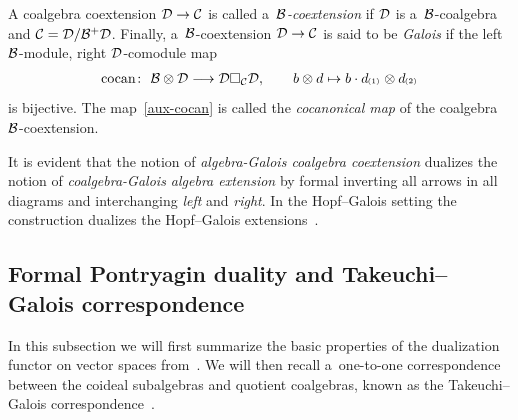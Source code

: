 \documentclass[pdftex]{sigma}
\numberwithin{equation}{section}
\newcommand{\ps}[1]{~\hspace{-4pt}_{^{(#1)}}}
\begin{document}
A coalgebra coextension ${\cal D}\to{\cal C}$ is called a~\emph{${\cal B}$-coextension} if ${\cal D}$ is a~${\cal
B}$-coalgebra and ${\cal C} ={\cal D}/{\cal B}^{+}{\cal D}$.
Finally, a~${\cal B}$-coextension ${\cal D}\to{\cal C}$ is said to be \emph{Galois} if the left ${\cal B}$-module, right
${\cal D}$-comodule map
\begin{gather}
\label{aux-cocan}
\operatorname{cocan}\colon \ {\cal B}\otimes {\cal D}\longrightarrow {\cal D}\Box_{\cal C}{\cal D},
\qquad
b\otimes d\mapsto b\cdot d\ps{1}\otimes d\ps{2}
\end{gather}
is bijective.
The map~\eqref{aux-cocan} is called the \emph{cocanonical map} of the coalgebra ${\cal B}$-coextension.

It is evident that the notion of \emph{algebra-Galois coalgebra coextension} dualizes the notion of
\emph{coalgebra-Galois algebra extension} by formal inverting all arrows in all diagrams and interchanging \emph{left}
and \emph{right}.
In the Hopf--Galois setting the construction dualizes the Hopf--Galois extensions~\cite{Schn93}.

\subsection{Formal Pontryagin duality and Takeuchi--Galois correspondence}\label{subsect-Pontryagin-dual}

In this subsection we will f\/irst summarize the basic properties of the dualization functor on vector spaces
from~\cite{BergmanHausknecht-book}.
We will then recall a~one-to-one correspondence between the coideal subalgebras and quotient coalgebras, known as the
Takeuchi--Galois correspondence~\cite{Take72}.
\end{document}
